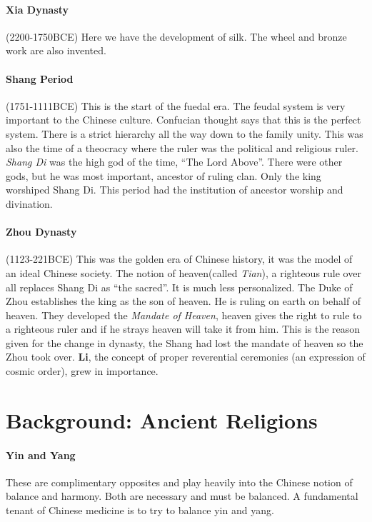 \documentclass{article}
\begin{document}
\paragraph{Xia Dynasty}
\label{par:xia_dynasty}
(2200-1750BCE) Here we have the development of silk. The wheel and bronze work are also invented.

\paragraph{Shang Period}
\label{par:shang_period}
(1751-1111BCE) This is the start of the fuedal era. The feudal system is very important to the Chinese culture. Confucian thought says that this is the perfect system. There is a strict hierarchy all the way down to the family unity. This was also the time of a theocracy where the ruler was the political and religious ruler. \emph{Shang Di} was the high god of the time, ``The Lord Above''. There were other gods, but he was most important, ancestor of ruling clan. Only the king worshiped Shang Di. This period had the institution of ancestor worship and divination.

\paragraph{Zhou Dynasty}
\label{par:zhou_dynasty}
(1123-221BCE) This was the golden era of Chinese history, it was the model of an ideal Chinese society. The notion of heaven(called \emph{Tian}), a righteous rule over all replaces Shang Di as ``the sacred''. It is much less personalized. The Duke of Zhou establishes the king as the son of heaven. He is ruling on earth on behalf of heaven. They developed the \emph{Mandate of Heaven}, heaven gives the right to rule to a righteous ruler and if he strays heaven will take it from him. This is the reason given for the change in dynasty, the Shang had lost the mandate of heaven so the Zhou took over. \textbf{Li}, the concept of proper reverential ceremonies (an expression of cosmic order), grew in importance.

\section*{Background: Ancient Religions}
\label{sec:background_ancient_religions}
\paragraph{Yin and Yang}
\label{par:yin_and_yang}
These are complimentary opposites and play heavily into the Chinese notion of balance and harmony. Both are necessary and must be balanced. A fundamental tenant of Chinese medicine is to try to balance yin and yang.
\end{document}
